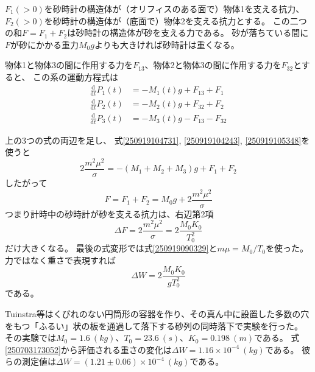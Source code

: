 \documentclass[dvipdfmx]{article}
\begin{document}
$F_1 (>0)$を砂時計の構造体が（オリフィスのある面で）物体1を支える抗力、
$F_2 (>0)$を砂時計の構造体が（底面で）物体2を支える抗力とする。
この二つの和$F=F_1+F_2$は砂時計の構造体が砂を支える力である。
砂が落ちている間に$F$が砂にかかる重力$M_0 g$よりも大きければ砂時計は重くなる。


物体1と物体3の間に作用する力を$F_{13}$、物体2と物体3の間に作用する力を$F_{32}$とすると、
この系の運動方程式は
\begin{align}
   \frac{\mathrm{d} }{\mathrm{d} t}  P_1(t) &=   - M_1(t) g + F_{13} + F_1\label{250703155015a}  \\
   \frac{\mathrm{d} }{\mathrm{d} t} P_2(t)  &=  - M_2(t) g  + F_{32} + F_2 \label{250703155015b} \\
   \frac{\mathrm{d} }{\mathrm{d} t} P_3(t) &=  - M_3(t) g  - F_{13} - F_{32} \label{250703155015c} 
\end{align}


上の3つの式の両辺を足し、
式\eqref{250919104731}, \eqref{250919104243}, \eqref{250919105348}を使うと
\begin{equation} \label{250917103450} 
  2\frac{m^2\mu^2}{\sigma}=  -(M_1+M_2+M_3) g + F_1 + F_2
\end{equation}
したがって
\begin{equation} \label{250919105951} 
   F = F_1 + F_2 = M_0 g +  2\frac{m^2\mu^2}{\sigma}
\end{equation}
つまり計時中の砂時計が砂を支える抗力は、右辺第2項
\begin{equation} \label{250703173105} 
   \Delta F  = 2 \frac{m^2\mu^2}{\sigma}  = 2 \frac{M_0K_0}{T_0^2} 
\end{equation}
だけ大きくなる。
最後の式変形では式\eqref{250919090329}と$m\mu=M_0/T_0$を使った。
力ではなく重さで表現すれば
\begin{equation} \label{250703173052} 
    \Delta W  =  2 \frac{M_0K_0}{gT_0^2} 
\end{equation}
である。


Tuinstra等はくびれのない円筒形の容器を作り、その真ん中に設置した多数の穴をもつ「ふるい」状の板を通過して落下する砂列の同時落下で実験を行った\cite{Tuinstra2010-wk}。
その実験では$M_0=1.6~\si{(kg)}$、$T_0=23.6~\si{(s)}$、$K_0=0.198~\si{(m)}$である。
%
式\eqref{250703173052}から評価される重さの変化は$\Delta W = 1.16\times 10^{-4}~\si{(kg)}$である。
彼らの測定値は$\Delta W = (1.21\pm 0.06)\times 10^{-4}~\si{(kg)}$である。
\end{document}
